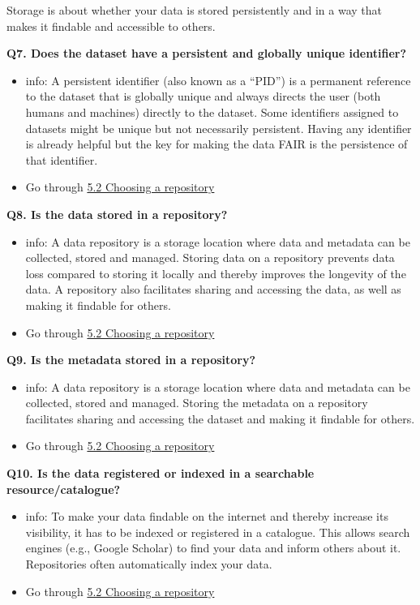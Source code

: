 \documentclass[
  oneside]{book}
\providecommand{\tightlist}{%
  \setlength{\itemsep}{0pt}\setlength{\parskip}{0pt}}
\begin{document}
Storage is about whether your data is stored persistently and in a way that makes it findable and accessible to others.

\textbf{Q7. Does the dataset have a persistent and globally unique identifier?}

\begin{itemize}
\tightlist
\item
  info: A persistent identifier (also known as a ``PID'') is a permanent reference to the dataset that is globally unique and always directs the user (both humans and machines) directly to the dataset. Some identifiers assigned to datasets might be unique but not necessarily persistent. Having any identifier is already helpful but the key for making the data FAIR is the persistence of that identifier.
\item
  Go through \hyperref[choosing-a-repository]{5.2 Choosing a repository}
\end{itemize}

\textbf{Q8. Is the data stored in a repository?}

\begin{itemize}
\tightlist
\item
  info: A data repository is a storage location where data and metadata can be collected, stored and managed. Storing data on a repository prevents data loss compared to storing it locally and thereby improves the longevity of the data. A repository also facilitates sharing and accessing the data, as well as making it findable for others.
\item
  Go through \hyperref[choosing-a-repository]{5.2 Choosing a repository}
\end{itemize}

\textbf{Q9. Is the metadata stored in a repository?}

\begin{itemize}
\tightlist
\item
  info: A data repository is a storage location where data and metadata can be collected, stored and managed. Storing the metadata on a repository facilitates sharing and accessing the dataset and making it findable for others.
\item
  Go through \hyperref[choosing-a-repository]{5.2 Choosing a repository}
\end{itemize}

\textbf{Q10. Is the data registered or indexed in a searchable resource/catalogue?}

\begin{itemize}
\tightlist
\item
  info: To make your data findable on the internet and thereby increase its visibility, it has to be indexed or registered in a catalogue. This allows search engines (e.g., Google Scholar) to find your data and inform others about it. Repositories often automatically index your data.
\item
  Go through \hyperref[choosing-a-repository]{5.2 Choosing a repository}
\end{itemize}
\end{document}
